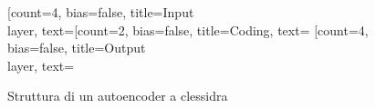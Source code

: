 \begin{figure}[!hb]
    \centering 
    \begin{neuralnetwork}[height=4]
        \newcommand{\nodetextclear}[2]{}
        [count=4, bias=false, title=Input\\layer, text=\nodetextclear]
        \hiddenlayer[count=2, bias=false, title=Coding,  text=\nodetextclear] \linklayers 
        \outputlayer[count=4, bias=false,  title=Output\\layer, text=\nodetextclear] \linklayers       
    \end{neuralnetwork}
    \caption{Struttura di un autoencoder a clessidra}
    \label{fig:autoencoder}
\end{figure}

